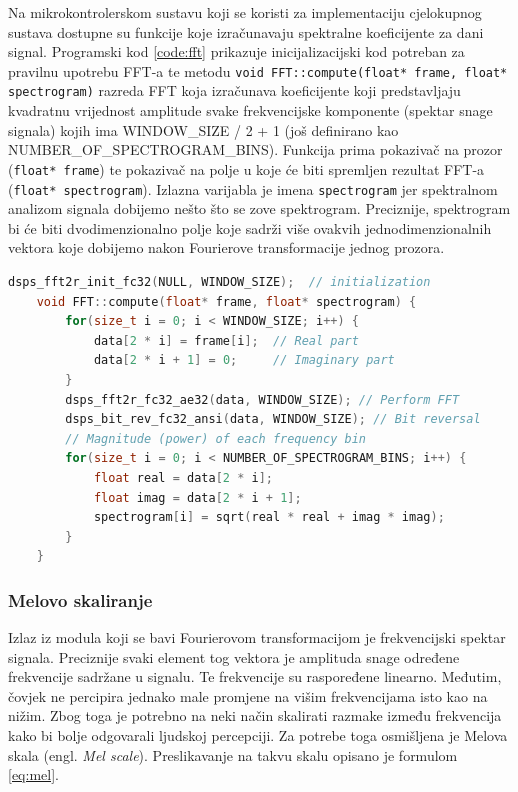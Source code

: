Na mikrokontrolerskom sustavu koji se koristi za implementaciju cjelokupnog sustava
dostupne su funkcije koje izračunavaju spektralne koeficijente za dani signal. 
Programski kod \ref{code:fft} prikazuje inicijalizacijski kod potreban za pravilnu 
upotrebu FFT-a te metodu \texttt{void FFT::compute(float* frame, float* spectrogram)} 
razreda FFT koja izračunava koeficijente koji predstavljaju kvadratnu vrijednost
amplitude svake frekvencijske komponente (spektar snage signala) kojih ima 
WINDOW\_SIZE / 2 + 1 (još definirano kao NUMBER\_OF\_SPECTROGRAM\_BINS). 
Funkcija prima pokazivač na prozor (\texttt{float* frame}) te pokazivač na polje
u koje će biti spremljen rezultat FFT-a (\texttt{float* spectrogram}). Izlazna
varijabla je imena \texttt{spectrogram} jer spektralnom analizom signala dobijemo
nešto što se zove spektrogram. Preciznije, spektrogram bi će biti dvodimenzionalno
polje koje sadrži više ovakvih jednodimenzionalnih vektora koje dobijemo nakon
Fourierove transformacije jednog prozora. 

\begin{lstlisting}[language=C++, caption=FFT, label=code:fft]
    dsps_fft2r_init_fc32(NULL, WINDOW_SIZE);  // initialization 
    void FFT::compute(float* frame, float* spectrogram) {
        for(size_t i = 0; i < WINDOW_SIZE; i++) {
            data[2 * i] = frame[i];  // Real part
            data[2 * i + 1] = 0;     // Imaginary part
        }
        dsps_fft2r_fc32_ae32(data, WINDOW_SIZE); // Perform FFT
        dsps_bit_rev_fc32_ansi(data, WINDOW_SIZE); // Bit reversal
        // Magnitude (power) of each frequency bin
        for(size_t i = 0; i < NUMBER_OF_SPECTROGRAM_BINS; i++) {
            float real = data[2 * i];
            float imag = data[2 * i + 1];
            spectrogram[i] = sqrt(real * real + imag * imag);
        }
    }
\end{lstlisting}


\subsubsection{Melovo skaliranje}
\label{sec:mel}
Izlaz iz modula koji se bavi Fourierovom transformacijom je frekvencijski spektar signala.
Preciznije svaki element tog vektora je amplituda snage određene frekvencije sadržane u signalu.
Te frekvencije su raspoređene linearno. Međutim, čovjek ne percipira jednako male promjene 
na višim frekvencijama isto kao na nižim. Zbog toga je potrebno na neki način skalirati
razmake između frekvencija kako bi bolje odgovarali ljudskoj percepciji. Za potrebe toga
osmišljena je Melova skala (engl. \textit{Mel scale}). Preslikavanje na takvu skalu opisano je formulom
\ref{eq:mel}.


